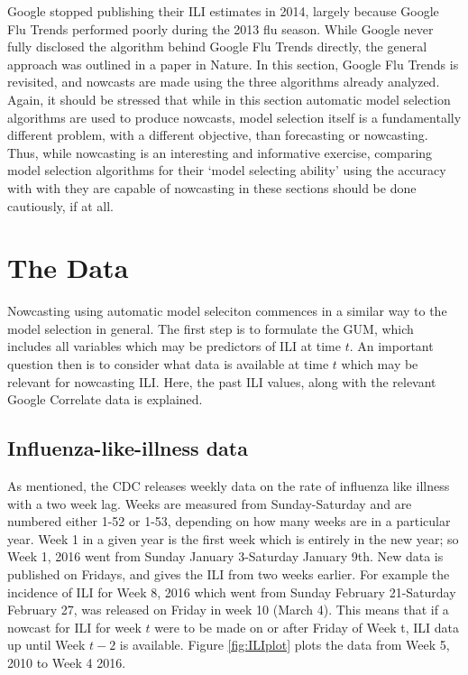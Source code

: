 \documentclass[11pt, oneside]{book}   	%
\begin{document}
Google stopped publishing their ILI estimates in 2014, largely because Google Flu Trends performed poorly during the 2013 flu season. While Google never fully disclosed the algorithm behind Google Flu Trends directly, the general approach was outlined in a paper in Nature. In this section, Google Flu Trends is revisited, and nowcasts are made using the three algorithms already analyzed. Again, it should be stressed that while in this section automatic model selection algorithms are used to produce nowcasts, model selection itself is a fundamentally different problem, with a different objective, than forecasting or nowcasting. Thus, while nowcasting is an interesting and informative exercise, comparing model selection algorithms for their `model selecting ability' using the accuracy with with they are capable of nowcasting in these sections should be done cautiously, if at all.  

\section{The Data}

Nowcasting using automatic model seleciton commences in a similar way to the model selection in general. The first step is to formulate the GUM, which includes all variables which may be predictors of ILI at time $t$. An important question then is to consider what data is available at time $t$ which may be relevant for nowcasting ILI. Here, the past ILI values, along with the relevant Google Correlate data is explained.

\subsection{Influenza-like-illness data}

As mentioned, the CDC releases weekly data on the rate of influenza like illness with a two week lag. Weeks are measured from Sunday-Saturday and are numbered either 1-52 or 1-53, depending on how many weeks are in a particular year. Week 1 in a given year is the first week which is entirely in the new year; so Week 1, 2016 went from Sunday January 3-Saturday January 9th. New data is published on Fridays, and gives the ILI from two weeks earlier. For example the incidence of ILI for Week 8, 2016 which went from Sunday February 21-Saturday February 27, was released on Friday in week 10 (March 4). This means that if a nowcast for ILI for week $t$ were to be made on or after Friday of Week t, ILI data up until Week $t-2$ is available. Figure \ref{fig:ILIplot} plots the data from Week 5, 2010 to Week 4 2016.
\end{document}
